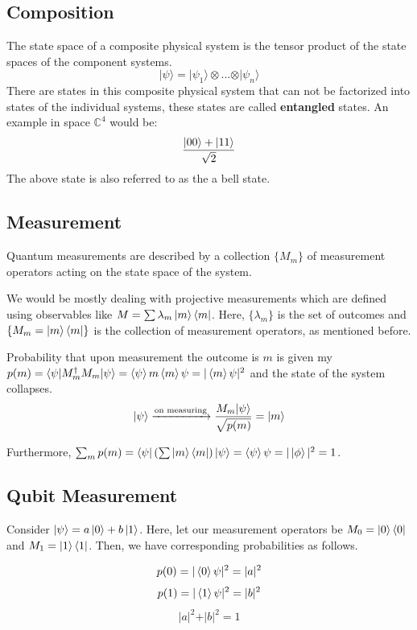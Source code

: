 \documentclass[11.5pt, paper=a4]{article}
\theoremstyle{definition}
\numberwithin{theorem}{section}
\begin{document}
\subsection{Composition}
The state space of a composite physical system is the tensor product of the state spaces of the component systems.
$$
\vert\psi\rangle = \vert\psi_1\rangle\otimes...\otimes\vert\psi_n\rangle
$$
There are states in this composite physical system that can not be factorized into states of the individual systems, these states are called \textbf{entangled} states. An example in space $\mathbb{C}^4$ would be:
\begin{equation*}
    \frac{\ket{00} + \ket{11}}{\sqrt{2}}
\end{equation*}
The above state is also referred to as the a bell state.

\subsection{Measurement}
Quantum measurements are described by a collection $\{M_m\}$ of measurement operators acting on the state space of the system. \newline

We would be mostly dealing with projective measurements which are defined using observables like $M = \sum \lambda_m \ket{m}\bra{m}$. Here, $\{\lambda_m\}$ is the set of outcomes and $\{M_m = \ket{m}\bra{m}\}$ is the collection of measurement operators, as mentioned before.\newline

Probability that upon measurement the outcome is $m$ is given my $p(m) = \langle\psi\vert M_m^\dagger M_m\vert\psi\rangle = \braket{\psi}{m}\braket{m}{\psi} = \vert\braket{m}{\psi}\vert^2$ and the state of the system collapses.
$$
\vert\psi\rangle \xrightarrow{\text{on measuring}} \frac{M_m\vert\psi\rangle}{\sqrt{p(m)}} = \ket{m}
$$

Furthermore, $\sum_m p(m) = \bra{\psi} (\sum \ket{m}\bra{m}) \ket{\psi} = \braket{\psi}{\psi} = \vert \ket{\phi} \vert^2 = 1$.

\subsection{Qubit Measurement}
Consider $\ket{\psi} = a \ket{0} + b \ket{1}$. Here, let our measurement operators be $M_0 = \ket{0}\bra{0}$ and $M_1 = \ket{1}\bra{1}$. Then, we have corresponding probabilities as follows.

$$p(0) = \vert \braket{0}{\psi} \vert^2 = \vert a \vert^2$$
$$p(1) = \vert \braket{1}{\psi} \vert^2 = \vert b \vert^2$$
$$\vert a\vert^2 + \vert b \vert^2 = 1$$
\end{document}
